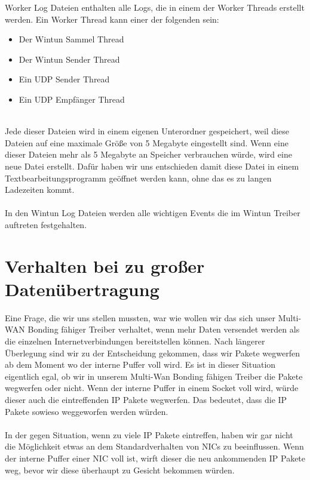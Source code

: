 \newpage
\noindent
Worker Log Dateien enthalten alle Logs, die in einem der Worker Threads erstellt werden. Ein Worker Thread kann einer der folgenden sein:
\\
\begin{itemize}
    \item Der Wintun Sammel Thread
    \item Der Wintun Sender Thread
    \item Ein UDP Sender Thread
    \item Ein UDP Empfänger Thread
\end{itemize}
\ \\
Jede dieser Dateien wird in einem eigenen Unterordner gespeichert, weil diese Dateien auf eine maximale Größe von 5 Megabyte eingestellt sind. Wenn eine dieser Dateien mehr als 5 Megabyte an Speicher verbrauchen würde, wird eine neue Datei erstellt. Dafür haben wir uns entschieden damit diese Datei in einem Textbearbeitungsprogramm geöffnet werden kann, ohne das es zu langen Ladezeiten kommt.
\\\\
In den Wintun Log Dateien werden alle wichtigen Events die im Wintun Treiber auftreten festgehalten.
\section{Verhalten bei zu großer Datenübertragung}
Eine Frage, die wir uns stellen mussten, war wie wollen wir das sich unser Multi-WAN Bonding fähiger Treiber verhaltet, wenn mehr Daten versendet werden als die einzelnen Internetverbindungen bereitstellen können. Nach längerer Überlegung sind wir zu der Entscheidung gekommen, dass wir Pakete wegwerfen ab dem Moment wo der interne Puffer voll wird. Es ist in dieser Situation eigentlich egal, ob wir in unserem Multi-Wan Bonding fähigen Treiber die Pakete wegwerfen oder nicht. Wenn der interne Puffer in einem Socket voll wird, würde dieser auch die eintreffenden IP Pakete wegwerfen. Das bedeutet, dass die IP Pakete sowieso weggeworfen werden würden.
\\\\
In der gegen Situation, wenn zu viele IP Pakete eintreffen, haben wir gar nicht die Möglichkeit etwas an dem Standardverhalten von NICs zu beeinflussen. Wenn der interne Puffer einer NIC voll ist, wirft dieser die neu ankommenden IP Pakete weg, bevor wir diese überhaupt zu Gesicht bekommen würden.